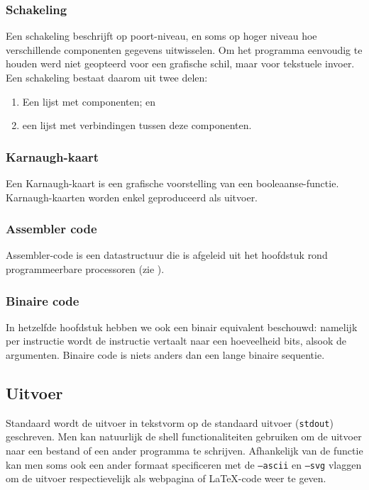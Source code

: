 \subsubsection{Schakeling}
Een schakeling beschrijft op poort-niveau, en soms op hoger niveau hoe verschillende componenten gegevens uitwisselen. Om het programma eenvoudig te houden werd niet geopteerd voor een grafische schil, maar voor tekstuele invoer. Een schakeling bestaat daarom uit twee delen:
\begin{enumerate}
 \item Een lijst met componenten; en
 \item een lijst met verbindingen tussen deze componenten.
\end{enumerate}

\subsubsection{Karnaugh-kaart}
Een Karnaugh-kaart is een grafische voorstelling van een booleaanse-functie. Karnaugh-kaarten worden enkel geproduceerd als uitvoer.

\subsubsection{Assembler code}
Assembler-code is een datastructuur die is afgeleid uit het hoofdstuk rond programmeerbare processoren (zie ).

\subsubsection{Binaire code}
In hetzelfde hoofdstuk hebben we ook een binair equivalent beschouwd: namelijk per instructie wordt de instructie vertaalt naar een hoeveelheid bits, alsook de argumenten. Binaire code is niets anders dan een lange binaire sequentie.

\subsection{Uitvoer}
Standaard wordt de uitvoer in tekstvorm op de standaard uitvoer (\texttt{stdout}) geschreven. Men kan natuurlijk de shell functionaliteiten gebruiken om de uitvoer naar een bestand of een ander programma te schrijven. Afhankelijk van de functie kan men soms ook een ander formaat specificeren met de \texttt{--ascii} en \texttt{--svg} vlaggen om de uitvoer respectievelijk als webpagina of \LaTeX-code weer te geven.

